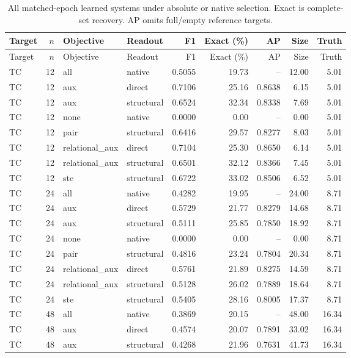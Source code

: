 \begin{longtable}{@{}lrl lrrrrr@{}}
\caption{All matched-epoch learned systems under absolute or native selection. Exact is complete-set recovery. AP omits full/empty reference targets.}\label{tab:gpu-learning-all}\\
\toprule
Target & $n$ & Objective & Readout & F1 & Exact (\%) & AP & Size & Truth\\
\midrule\endfirsthead
\toprule
Target & $n$ & Objective & Readout & F1 & Exact (\%) & AP & Size & Truth\\
\midrule\endhead
TC & 12 & all & native & 0.5055 & 19.73 & -- & 12.00 & 5.01\\
TC & 12 & aux & direct & 0.7106 & 25.16 & 0.8638 & 6.15 & 5.01\\
TC & 12 & aux & structural & 0.6524 & 32.34 & 0.8338 & 7.69 & 5.01\\
TC & 12 & none & native & 0.0000 & 0.00 & -- & 0.00 & 5.01\\
TC & 12 & pair & structural & 0.6416 & 29.57 & 0.8277 & 8.03 & 5.01\\
TC & 12 & relational\_aux & direct & 0.7104 & 25.30 & 0.8650 & 6.14 & 5.01\\
TC & 12 & relational\_aux & structural & 0.6501 & 32.12 & 0.8366 & 7.45 & 5.01\\
TC & 12 & ste & structural & 0.6722 & 33.02 & 0.8506 & 6.52 & 5.01\\
TC & 24 & all & native & 0.4282 & 19.95 & -- & 24.00 & 8.71\\
TC & 24 & aux & direct & 0.5729 & 21.77 & 0.8279 & 14.68 & 8.71\\
TC & 24 & aux & structural & 0.5111 & 25.85 & 0.7850 & 18.92 & 8.71\\
TC & 24 & none & native & 0.0000 & 0.00 & -- & 0.00 & 8.71\\
TC & 24 & pair & structural & 0.4816 & 23.24 & 0.7804 & 20.34 & 8.71\\
TC & 24 & relational\_aux & direct & 0.5761 & 21.89 & 0.8275 & 14.59 & 8.71\\
TC & 24 & relational\_aux & structural & 0.5128 & 26.02 & 0.7889 & 18.64 & 8.71\\
TC & 24 & ste & structural & 0.5405 & 28.16 & 0.8005 & 17.37 & 8.71\\
TC & 48 & all & native & 0.3869 & 20.15 & -- & 48.00 & 16.34\\
TC & 48 & aux & direct & 0.4574 & 20.07 & 0.7891 & 33.02 & 16.34\\
TC & 48 & aux & structural & 0.4268 & 21.96 & 0.7631 & 41.73 & 16.34\\

\end{longtable}
